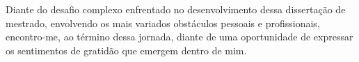 \begin{agradecimentos}

    Diante do desafio complexo enfrentado no desenvolvimento dessa dissertação de mestrado, envolvendo os mais variados obstáculos pessoais e profissionais, encontro-me, ao término dessa jornada, diante de uma oportunidade de expressar os sentimentos de gratidão que emergem dentro de mim.

    




	
\end{agradecimentos}